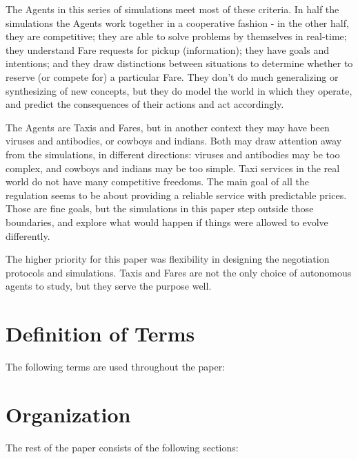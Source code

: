 \documentclass[11pt,letterpaper,onecolumn,twoside,openright,final]{report}
\begin{document}
The Agents in this series of simulations meet most of these criteria.
In half the simulations the Agents work together in a cooperative fashion - in the other half, they are competitive; they are able to solve problems by themselves in real-time; they understand Fare requests for pickup (information); they have goals and intentions; and they draw distinctions between situations to determine whether to reserve (or compete for) a particular Fare.
They don't do much generalizing or synthesizing of new concepts, but they do model the world in which they operate, and predict the consequences of their actions and act accordingly.

The Agents are Taxis and Fares, but in another context they may have been viruses and antibodies, or cowboys and indians.
Both may draw attention away from the simulations, in different directions: viruses and antibodies may be too complex, and cowboys and indians may be too simple.
Taxi services in the real world do not have many competitive freedoms.
The main goal of all the regulation seems to be about providing a reliable service with predictable prices.
Those are fine goals, but the simulations in this paper step outside those boundaries, and explore what would happen if things were allowed to evolve differently.

The higher priority for this paper was flexibility in designing the negotiation protocols and simulations.
Taxis and Fares are not the only choice of autonomous agents to study, but they serve the purpose well.

\section{Definition of Terms}
The following terms are used throughout the paper:

\section{Organization}
The rest of the paper consists of the following sections:
\end{document}

